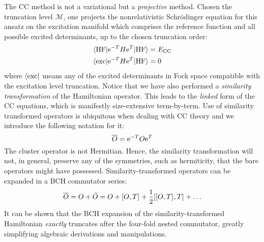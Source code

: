 The \acrshort{CC} method is not a variational but a \emph{projective} method.
Chosen the truncation level $\mathcal{M}$, one projects the
nonrelativistic Schrödinger equation for this ansatz on the excitation
manifold which comprises the reference function and all possible excited
determinants, up to the chosen truncation order:
\begin{subequations}
  \begin{align}
    \braket{\mathrm{HF} | \mathrm{e}^{-T}H\mathrm{e}^{T} | \mathrm{HF}} &= E_\mathrm{CC} \\
    \braket{\mathrm{exc} | \mathrm{e}^{-T}H\mathrm{e}^{T} | \mathrm{HF}} &= 0
  \end{align}
\end{subequations}
where $\bra{\mathrm{exc}}$ means any of the excited determinants in Fock
space compatible with the excitation level truncation.
Notice that we have also performed a \emph{similarity transformation} of
the Hamiltonian operator. This leads to the \emph{linked} form of the
\acrshort{CC} equations, which is manifestly size-extensive term-by-term.
Use of similarity transformed operators is ubiquitous when dealing with
\acrshort{CC} theory and we introduce the following notation for it:
\begin{equation}\label{eq:similarity-transformation}
  \overline{O} =\mathrm{e}^{-T}O\mathrm{e}^{T}
\end{equation}
The cluster operator is not Hermitian. Hence, the similarity transformation
will not, in general, preserve any of the symmetries, such as
hermiticity, that the bare operators might have possessed.
Similarity-transformed operators can be expanded in a \acrshort{BCH}
commutator series:
\begin{equation}\label{eq:bch}
  \overline{O}
  =
  O + \tilde{O}
  =
  O + [ O, T ]^{} + \frac{1}{2}[ [ O, T ]^{}, T ]^{} + \ldots
\end{equation}
It can be shown that the \acrshort{BCH} expansion of the
similarity-transformed Hamiltonian \emph{exactly} truncates after the
four-fold nested commutator, greatly simplifying algebraic derivations
and manipulations.\autocite{Helgaker2000-tz}


